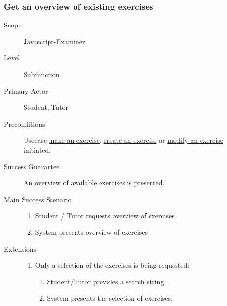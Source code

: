 \subsubsection{Get an overview of existing exercises}
\begin{mdframed} [rightmargin=-100pt]
\begin{description}
  \item[Scope] Javascript-Examiner
  \item[Level] Subfunction
  \item[Primary Actor] Student, Tutor
  \item[Preconditions] Usecase \underline{make an exercise}, 
							   \underline{create an exercise} or
							   \underline{modify an exercise} initiated.
  \item[Success Guarantee] An overview of available exercises is 
    presented.
  \item[Main Success Scenario] \mbox{}
    \begin{enumerate} 
	  \item Student / Tutor requests overview of exercises
	  \item System presents overview of exercises
	\end{enumerate}
  \item[Extensions] \mbox{}
    \begin{enumerate}
	  \renewcommand{\labelenumi}{\theenumi a.}
	  \item Only a selection of the exercises is being requested:
		\begin{enumerate}[(1)]
		  \renewcommand{\labelenumii}{\theenumii .}
		  \item Student/Tutor provides a search string.
		  \item System presents the selection of exercises.
		\end{enumerate}
	\end{enumerate}
\end{description}
\end{mdframed}

